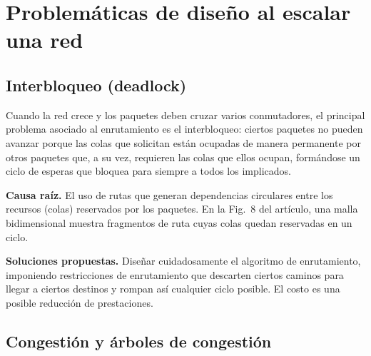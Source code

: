 \documentclass[12pt,a4paper]{article}
\begin{document}
\section{Problemáticas de diseño al escalar una red}

\subsection{Interbloqueo (deadlock)}

Cuando la red crece y los paquetes deben cruzar varios conmutadores, el principal problema asociado al enrutamiento es el interbloqueo: ciertos paquetes no pueden avanzar porque las colas que solicitan están ocupadas de manera permanente por otros paquetes que, a su vez, requieren las colas que ellos ocupan, formándose un ciclo de esperas que bloquea para siempre a todos los implicados.

\textbf{Causa raíz.} El uso de rutas que generan dependencias circulares entre los recursos (colas) reservados por los paquetes. En la Fig.~8 del artículo, una malla bidimensional muestra fragmentos de ruta cuyas colas quedan reservadas en un ciclo.

\textbf{Soluciones propuestas.} Diseñar cuidadosamente el algoritmo de enrutamiento, imponiendo restricciones de enrutamiento que descarten ciertos caminos para llegar a ciertos destinos y rompan así cualquier ciclo posible. El costo es una posible reducción de prestaciones.

\begin{center}
\end{center}

\subsection{Congestión y árboles de congestión}
\end{document}
